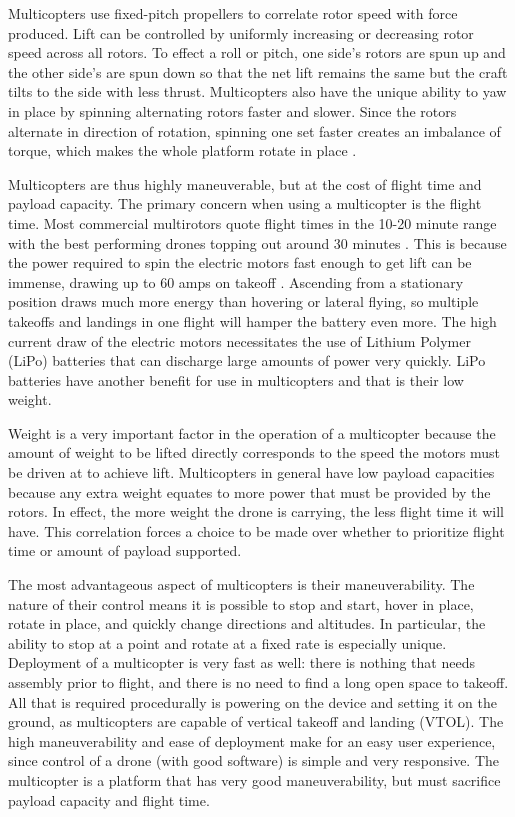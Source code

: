 Multicopters use fixed-pitch propellers to correlate rotor speed with force produced. Lift can be controlled by uniformly increasing or decreasing rotor speed across all rotors. To effect a roll or pitch, one side's rotors are spun up and the other side's are spun down so that the net lift remains the same but the craft tilts to the side with less thrust. Multicopters also have the unique ability to yaw in place by spinning alternating rotors faster and slower. Since the rotors alternate in direction of rotation, spinning one set faster creates an imbalance of torque, which makes the whole platform rotate in place \cite{multicopter_dynamics_2}.\par
Multicopters are thus highly maneuverable, but at the cost of flight time and payload capacity. The primary concern when using a multicopter is the flight time. Most commercial multirotors quote flight times in the 10-20 minute range with the best performing drones topping out around 30 minutes \cite{multicopter_comparison}. This is because the power required to spin the electric motors fast enough to get lift can be immense, drawing up to 60 amps on takeoff \cite{multicopter_long_range_mqp}. Ascending from a stationary position draws much more energy than hovering or lateral flying, so multiple takeoffs and landings in one flight will hamper the battery even more. The high current draw of the electric motors necessitates the use of Lithium Polymer (LiPo) batteries that can discharge large amounts of power very quickly. LiPo batteries have another benefit for use in multicopters and that is their low weight.\par
Weight is a very important factor in the operation of a multicopter because the amount of weight to be lifted directly corresponds to the speed the motors must be driven at to achieve lift. Multicopters in general have low payload capacities because any extra weight equates to more power that must be provided by the rotors. In effect, the more weight the drone is carrying, the less flight time it will have. This correlation forces a choice to be made over whether to prioritize flight time or amount of payload supported.\par
The most advantageous aspect of multicopters is their maneuverability. The nature of their control means it is possible to stop and start, hover in place, rotate in place, and quickly change directions and altitudes. In particular, the ability to stop at a point and rotate at a fixed rate is especially unique. Deployment of a multicopter is very fast as well: there is nothing that needs assembly prior to flight, and there is no need to find a long open space to takeoff. All that is required procedurally  is powering on the device and setting it on the ground, as multicopters are capable of vertical takeoff and landing (VTOL). The high maneuverability and ease of deployment make for an easy user experience, since control of a drone (with good software) is simple and very responsive. The multicopter is a platform that has very good maneuverability, but must sacrifice payload capacity and flight time.
